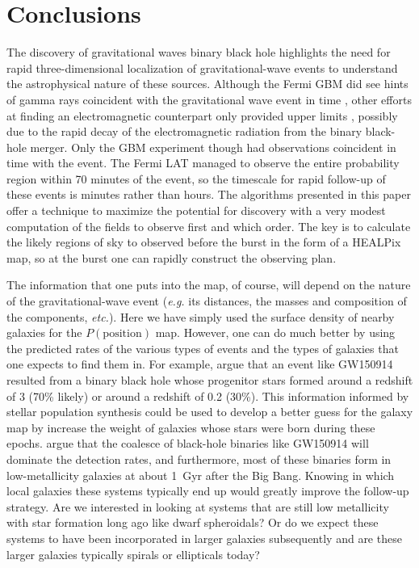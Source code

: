 \documentclass[useAMS,usenatbib]{mn2e}
\begin{document}
\section{Conclusions}

The discovery of gravitational waves binary black hole highlights the
need for rapid three-dimensional localization of gravitational-wave
events to understand the astrophysical nature of these sources.
Although the Fermi GBM did see hints of gamma rays coincident with the
gravitational wave event in time \citep{2016arXiv160203920C}, other
efforts at finding an electromagnetic counterpart only provided upper limits
\citep[e.g][]{2016arXiv160208492A,2016arXiv160204198S,2016arXiv160204156S,2016arXiv160204488F},
possibly due to the rapid decay of the electromagnetic radiation from
the binary black-hole merger.  Only the GBM experiment though had
observations coincident in time with the event.  The Fermi LAT managed
to observe the entire probability region within 70 minutes of the
event, so the timescale for rapid follow-up of these events is minutes
rather than hours.  The algorithms presented in this paper offer a
technique to maximize the potential for discovery with a very modest
computation of the fields to observe first and which order.  The key
is to calculate the likely regions of sky to observed before the burst
in the form of a HEALPix map, so at the burst one can rapidly
construct the observing plan.

The information that one puts into the map, of course, will depend on
the nature of the gravitational-wave event ({\em e.g.} its distances,
the masses and composition of the components, {\em etc.}).  Here we
have simply used the surface density of nearby galaxies for the
$P(\mathrm{position})$ map.  However, one can do much better by using
the predicted rates of the various types of events and the types of
galaxies that one expects to find them in.  For example,
\citet{2016arXiv160204531B} argue that an event like GW150914 resulted
from a binary black hole whose progenitor stars formed around a
redshift of 3 (70\% likely) or around a redshift of 0.2 (30\%).  This
information informed by stellar population synthesis could be used to
develop a better guess for the galaxy map by increase the weight of
galaxies whose stars were born during these epochs.
\citet{2015ApJ...806..263D} argue that the coalesce of black-hole
binaries like GW150914 will dominate the detection rates, and
furthermore, most of these binaries form in low-metallicity galaxies
at about 1~Gyr after the Big Bang.  Knowing in which local galaxies
these systems typically end up would greatly improve the follow-up
strategy.  Are we interested in looking at systems that are still low
metallicity with star formation long ago like dwarf spheroidals?  Or
do we expect these systems to have been incorporated in larger galaxies
subsequently and are these larger galaxies typically spirals or
ellipticals today?
\end{document}
